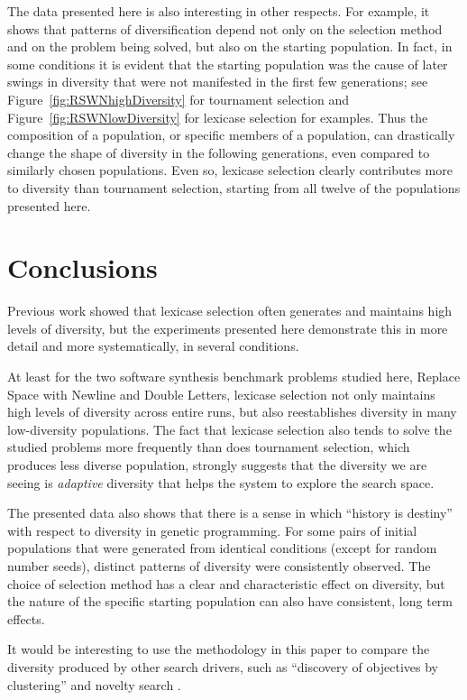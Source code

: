 \documentclass{sig-alternate-05-2015}
\begin{document}
The data presented here is also interesting in other respects. For example, it shows that patterns of diversification depend not only on the selection method and on the problem being solved, but also on the starting population. In fact, in some conditions it is evident that the starting population was the cause of later swings in diversity that were not manifested in the first few generations; see Figure~\ref{fig:RSWNhighDiversity} for tournament selection and Figure~\ref{fig:RSWNlowDiversity} for lexicase selection for examples. Thus the composition of a population, or specific members of a population, can drastically change the shape of diversity in the following generations, even compared to similarly chosen populations. Even so, lexicase selection clearly contributes more to diversity than tournament selection, starting from all twelve of the populations presented here.


\section{Conclusions}
\label{sec:conclusions}

Previous work showed that lexicase selection often generates and maintains high levels of diversity, but the experiments presented here demonstrate this in more detail and more systematically, in several conditions.

At least for the two software synthesis benchmark problems studied here, Replace Space with Newline and Double Letters, lexicase selection not only maintains high levels of diversity across entire runs, but also reestablishes diversity in many low-diversity populations. The fact that lexicase selection also tends to solve the studied problems more frequently than does tournament selection, which produces less diverse population, strongly suggests that the diversity we are seeing is {\it adaptive} diversity that helps the system to explore the search space.

The presented data also shows that there is a sense in which ``history is destiny'' with respect to diversity in genetic programming. For some pairs of initial populations that were generated from identical conditions (except for random number seeds), distinct patterns of diversity were consistently observed. The choice of selection method has a clear and characteristic effect on diversity, but the nature of the specific starting population can also have consistent, long term effects.

It would be interesting to use the methodology in this paper to compare the diversity produced by other search drivers, such as ``discovery of objectives by clustering'' \cite{Krawiec:2015:EuroGP} and novelty search \cite{Lehman:2011:EDV:2001576.2001606}.
\end{document}
